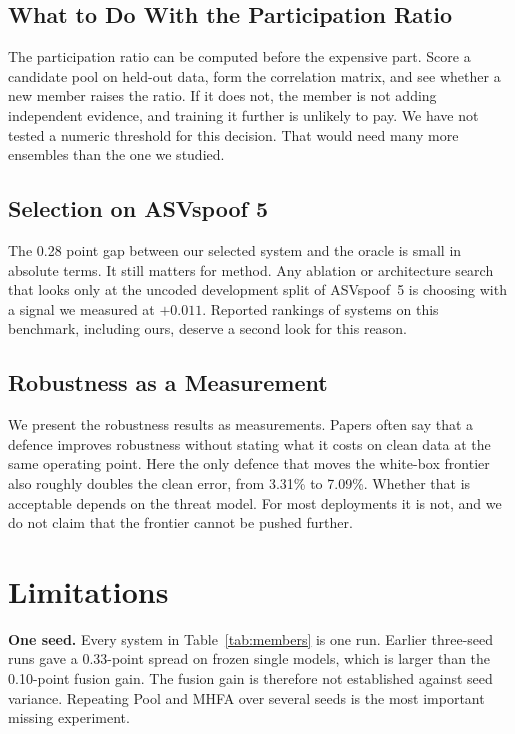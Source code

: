 \documentclass[twocolumn,a4paper,11pt]{article}
\begin{document}
\subsection{What to Do With the Participation Ratio}

The participation ratio can be computed before the expensive part. Score a
candidate pool on held-out data, form the correlation matrix, and see whether a
new member raises the ratio. If it does not, the member is not adding
independent evidence, and training it further is unlikely to pay. We have not
tested a numeric threshold for this decision. That would need many more
ensembles than the one we studied.

\subsection{Selection on ASVspoof 5}

The 0.28 point gap between our selected system and the oracle is small in
absolute terms. It still matters for method. Any ablation or architecture
search that looks only at the uncoded development split of ASVspoof~5 is
choosing with a signal we measured at $+0.011$. Reported rankings of
systems on this benchmark, including ours, deserve a second look for this
reason.

\subsection{Robustness as a Measurement}

We present the robustness results as measurements. Papers often say that a
defence improves robustness without stating what it costs on clean data at the
same operating point. Here the only defence that moves the white-box frontier
also roughly doubles the clean error, from 3.31\% to 7.09\%. Whether that is
acceptable depends on the threat model. For most deployments it is not, and we
do not claim that the frontier cannot be pushed further.

\section{Limitations}
\label{sec:limit}

\textbf{One seed.} Every system in Table~\ref{tab:members} is one run. Earlier
three-seed runs gave a 0.33-point spread on frozen single models, which is
larger than the 0.10-point fusion gain. The fusion gain is therefore not
established against seed variance. Repeating Pool and MHFA over several seeds
is the most important missing experiment.
\end{document}
